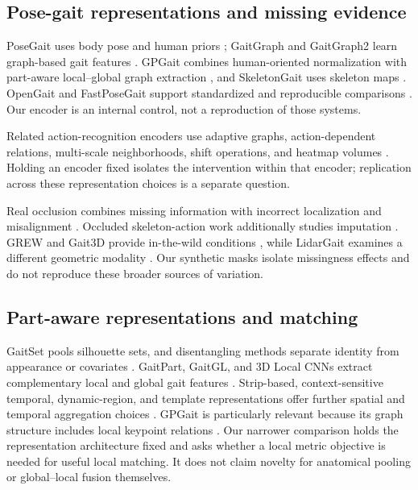 \documentclass[pdflatex,iicol,sn-apa]{sn-jnl}
\begin{document}
\subsection{Pose-gait representations and missing evidence}

PoseGait uses body pose and human priors \citep{liao2020posegait}; GaitGraph
and GaitGraph2 learn graph-based gait features
\citep{teepe2021gaitgraph,teepe2022gaitgraph2}. GPGait combines human-oriented
normalization with part-aware local--global graph extraction
\citep{fu2023gpgait}, and SkeletonGait uses skeleton maps
\citep{fan2024skeletongait}. OpenGait and FastPoseGait support standardized
and reproducible comparisons \citep{fan2022opengait,meng2023fastposegait}.
Our encoder is an internal control, not a reproduction of those systems.

Related action-recognition encoders use adaptive graphs, action-dependent
relations, multi-scale neighborhoods, shift operations, and heatmap volumes
\citep{shi2019adaptive,li2019actional,liu2020msg3d,cheng2020shift,duan2022posec3d}.
Holding an encoder fixed isolates the intervention within that encoder;
replication across these representation choices is a separate question.

Real occlusion combines missing information with incorrect localization and
misalignment \citep{li2024survey,huang2024occluded}. Occluded skeleton-action
work additionally studies imputation \citep{chen2023iopstl}. GREW and Gait3D
provide in-the-wild conditions \citep{zhu2021grew,zheng2022gait3d}, while
LidarGait examines a different geometric modality \citep{shen2023lidargait}.
Our synthetic masks isolate missingness effects and do not reproduce these
broader sources of variation.

\subsection{Part-aware representations and matching}

GaitSet pools silhouette sets, and disentangling methods separate identity
from appearance or covariates
\citep{chao2019gaitset,zhang2019disentangled,li2020disentangled}.
GaitPart, GaitGL, and 3D Local CNNs extract complementary local and global gait
features \citep{fan2020gaitpart,lin2021gaitgl,huang2021local}. Strip-based,
context-sensitive temporal, dynamic-region, and template representations offer
further spatial and temporal aggregation choices
\citep{wang2022gaitstrip,huang2021cstl,wang2023dygait,huang2025template}.
GPGait is particularly relevant because its graph structure includes local
keypoint relations \citep{fu2023gpgait}. Our narrower comparison holds the
representation architecture fixed and asks whether a local metric objective
is needed for useful local matching. It does not claim novelty for anatomical
pooling or global--local fusion themselves.
\end{document}
